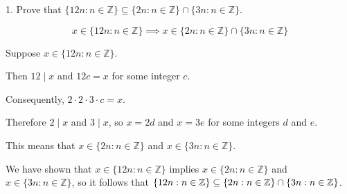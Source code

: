 \documentclass{idrisMemo}
\begin{document}
\toc

\begin{prooflist}{1. Prove that $\{12 n: n \in \mathbb{Z}\} \subseteq\{2 n: n \in \mathbb{Z}\} \cap\{3 n: n \in \mathbb{Z}\}$.}
\item

\[
x \in \{12 n: n \in \mathbb{Z}\}
\implies
x \in \{2 n: n \in \mathbb{Z}\} \cap\{3 n: n \in \mathbb{Z}\}
\]
\item Suppose $x \in \{12 n: n \in \mathbb{Z}\}$.
\item Then $12 \mid x$ and $12c=x$
    for some integer $c$.
\item Consequently, $2\cdot2\cdot3\cdot c =x$.
\item Therefore $2\mid x$ and $3\mid x$, so $x =2d$ and $x=3e$ for some integers
    $d$ and $e$.
\item
This means that $x \in \{2 n: n \in \mathbb{Z}\}$ and $x \in \{3 n: n \in
    \mathbb{Z}\}$.
\item
We have shown that
$x \in \{12 n: n \in \mathbb{Z}\}$
implies
$x \in\{2n: n \in \mathbb{Z}\}$
and
$x \in\{3n: n \in \mathbb{Z}\}$,
so it follows that
$\{12 n: n \in \mathbb{Z}\} \subseteq\{2 n: n \in \mathbb{Z}\} \cap\{3 n: n \in
\mathbb{Z}\}$.
\end{prooflist}
\end{document}
